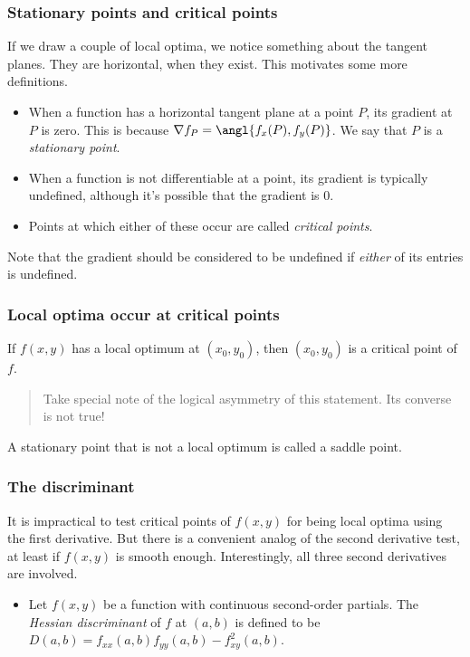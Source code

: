 \documentclass[11pt,ignorenonframetext,aspectratio=169,xcolor={svgnames}]{beamer}
\begin{document}
\begin{frame}\frametitle{Stationary points and critical points}

If we draw a couple of local optima, we notice something about the
tangent planes. They are horizontal, when they exist. This motivates
some more definitions.

\begin{itemize}

\item
  When a function has a horizontal tangent plane at a point $P$, its
  gradient at $P$ is zero. This is because
  $\nabla f_{P} = \angl{f_x(P), f_y(P)}$. We say that $P$ is a
  \emph{stationary point}.
\item
  When a function is not differentiable at a point, its gradient is
  typically undefined, although it's possible that the gradient is 0.
\item
  Points at which either of these occur are called \emph{critical
  points}.
\end{itemize}

Note that the gradient should be considered to be undefined if
\emph{either} of its entries is undefined.

\end{frame}

\begin{frame}\frametitle{Local optima occur at critical points}

If $f(x,y)$ has a local optimum at $(x_0, y_0)$, then $(x_0, y_0)$ is a
critical point of $f$.

\begin{quote}
Take special note of the logical asymmetry of this statement. Its
converse is not true!
\end{quote}

A stationary point that is not a local optimum is called a saddle point.

\end{frame}

\begin{frame}\frametitle{The discriminant}

It is impractical to test critical points of $f(x,y)$ for being local
optima using the first derivative. But there is a convenient analog of
the second derivative test, at least if $f(x,y)$ is smooth enough.
Interestingly, all three second derivatives are involved.

\begin{itemize}

\item
  Let $f(x,y)$ be a function with continuous second-order partials. The
  \emph{Hessian discriminant} of $f$ at $(a,b)$ is defined to be
  $D(a,b) = f_{xx}(a,b) f_{yy}(a,b) - f^2_{xy}(a,b)$.
\end{itemize}

\end{frame}
\end{document}
